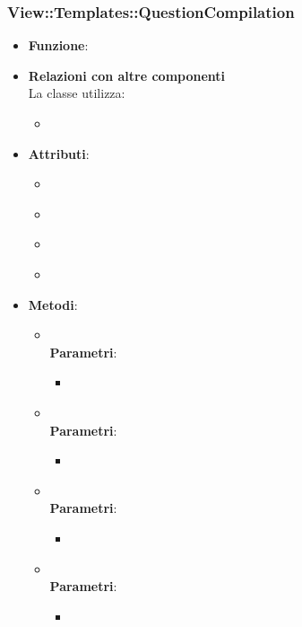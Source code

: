 \subsubsection{View::Templates::QuestionCompilation}
\begin{itemize}
\item\textbf{Funzione}:
\item\textbf{Relazioni con altre componenti}\\
La classe utilizza:
	\begin{itemize}
		\item
	\end{itemize}
\item\textbf{Attributi}:
	\begin{itemize}
		\item\code{}\\
		\item\code{}\\
		\item\code{}\\
		\item\code{}\\
	\end{itemize}
\item\textbf{Metodi}:
	\begin{itemize}
		\item\code{}\\
		\textbf{Parametri}:
			\begin{itemize}
				\item\code{}\\
			\end{itemize}
		\item\code{}\\
		\textbf{Parametri}:
			\begin{itemize}
				\item\code{}\\
			\end{itemize}
		\item\code{}\\
		\textbf{Parametri}:
			\begin{itemize}
				\item\code{}\\
			\end{itemize}
		\item\code{}\\
		\textbf{Parametri}:
			\begin{itemize}
				\item\code{}\\
			\end{itemize}
	\end{itemize}
\end{itemize}


